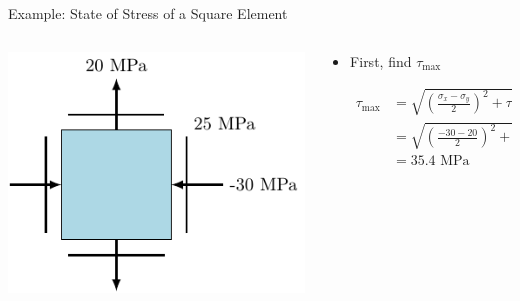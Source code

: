 \documentclass[10pt, svgnames]{beamer}
\begin{document}
\begin{frame}[label={sec:org938ef91}]{Example: State of Stress of a Square Element}
\begin{columns}
\begin{column}{0.4\columnwidth}
\begin{center}
\includegraphics[width=\textwidth]{pictures/example-I-prob.pdf}
\end{center}
\end{column}

\begin{column}{0.6\columnwidth}
\begin{itemize}
\item First, find \(\tau_{\max}\)

\begin{align*}
  \tau_{\max} &= \sqrt {\left( \frac{\sigma_x - \sigma_y}{2} \right)^2 + \tau _{xy}^2}  \\
              &= \sqrt {\left( \frac{-30 - 20}{2} \right)^2 + 25^2}  \\
              &= 35.4 \text{ MPa}
\end{align*}
\end{itemize}
\end{column}
\end{columns}
\end{frame}
\end{document}

